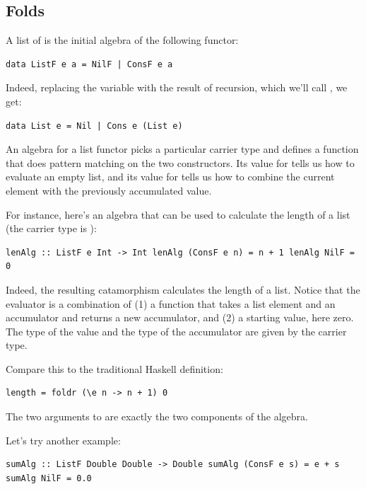 \subsection{Folds}\label{folds}

A list of  is the initial algebra of the following functor:

\begin{verbatim}
data ListF e a = NilF | ConsF e a
\end{verbatim}

Indeed, replacing the variable  with the result of recursion,
which we'll call , we get:

\begin{verbatim}
data List e = Nil | Cons e (List e)
\end{verbatim}

An algebra for a list functor picks a particular carrier type and
defines a function that does pattern matching on the two constructors.
Its value for  tells us how to evaluate an empty list, and
its value for  tells us how to combine the current element
with the previously accumulated value.

For instance, here's an algebra that can be used to calculate the length
of a list (the carrier type is ):

\begin{verbatim}
lenAlg :: ListF e Int -> Int lenAlg (ConsF e n) = n + 1 lenAlg NilF = 0
\end{verbatim}

Indeed, the resulting catamorphism  calculates the
length of a list. Notice that the evaluator is a combination of (1) a
function that takes a list element and an accumulator and returns a new
accumulator, and (2) a starting value, here zero. The type of the value
and the type of the accumulator are given by the carrier type.

Compare this to the traditional Haskell definition:

\begin{verbatim}
length = foldr (\e n -> n + 1) 0
\end{verbatim}

The two arguments to  are exactly the two components of
the algebra.

Let's try another example:

\begin{verbatim}
sumAlg :: ListF Double Double -> Double sumAlg (ConsF e s) = e + s sumAlg NilF = 0.0
\end{verbatim}

